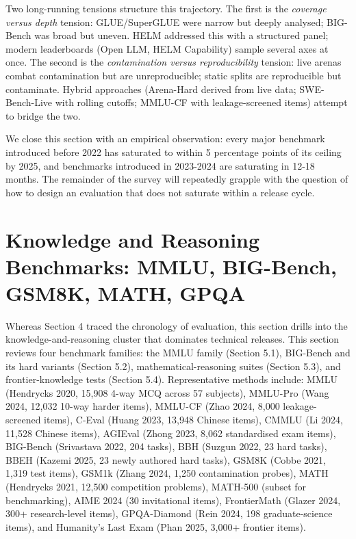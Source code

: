 Two long-running tensions structure this trajectory. The first is the \emph{coverage versus depth} tension: GLUE/SuperGLUE were narrow but deeply analysed; BIG-Bench was broad but uneven. HELM addressed this with a structured panel; modern leaderboards (Open LLM, HELM Capability) sample several axes at once. The second is the \emph{contamination versus reproducibility} tension: live arenas combat contamination but are unreproducible; static splits are reproducible but contaminate. Hybrid approaches (Arena-Hard derived from live data; SWE-Bench-Live with rolling cutoffs; MMLU-CF with leakage-screened items) attempt to bridge the two.

We close this section with an empirical observation: every major benchmark introduced before 2022 has saturated to within 5 percentage points of its ceiling by 2025, and benchmarks introduced in 2023-2024 are saturating in 12-18 months. The remainder of the survey will repeatedly grapple with the question of how to design an evaluation that does not saturate within a release cycle.

\section{Knowledge and Reasoning Benchmarks: MMLU, BIG-Bench, GSM8K, MATH, GPQA}\label{knowledge-and-reasoning-benchmarks-mmlu-big-bench-gsm8k-math-gpqa}

Whereas Section 4 traced the chronology of evaluation, this section drills into the knowledge-and-reasoning cluster that dominates technical releases. This section reviews four benchmark families: the MMLU family (Section 5.1), BIG-Bench and its hard variants (Section 5.2), mathematical-reasoning suites (Section 5.3), and frontier-knowledge tests (Section 5.4). Representative methods include: MMLU (Hendrycks 2020, 15,908 4-way MCQ across 57 subjects), MMLU-Pro (Wang 2024, 12,032 10-way harder items), MMLU-CF (Zhao 2024, 8,000 leakage-screened items), C-Eval (Huang 2023, 13,948 Chinese items), CMMLU (Li 2024, 11,528 Chinese items), AGIEval (Zhong 2023, 8,062 standardised exam items), BIG-Bench (Srivastava 2022, 204 tasks), BBH (Suzgun 2022, 23 hard tasks), BBEH (Kazemi 2025, 23 newly authored hard tasks), GSM8K (Cobbe 2021, 1,319 test items), GSM1k (Zhang 2024, 1,250 contamination probes), MATH (Hendrycks 2021, 12,500 competition problems), MATH-500 (subset for benchmarking), AIME 2024 (30 invitational items), FrontierMath (Glazer 2024, 300+ research-level items), GPQA-Diamond (Rein 2024, 198 graduate-science items), and Humanity's Last Exam (Phan 2025, 3,000+ frontier items).

